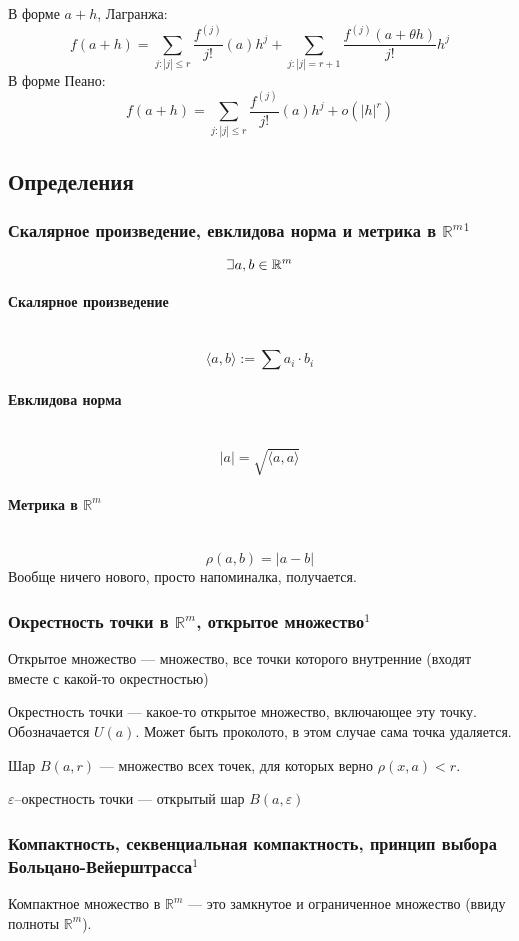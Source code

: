 \documentclass{article}
\def\letus{%
\mathord{\setbox0=\hbox{$\exists$}%
         \hbox{\kern 0.125\wd0%
               \vbox to \ht0{%
                  \hrule width 0.75\wd0%
                  \vfill%
                  \hrule width 0.75\wd0}%
               \vrule height \ht0%
               \kern 0.125\wd0}%
       }%
        }
\let\vanillaparagraph\paragraph
\renewcommand{\paragraph}[1]{\vanillaparagraph{#1}\mbox{}\\}
\begin{document}
В форме $a + h$, Лагранжа:
$$
f(a + h) = \sum_{j:|j| \leq r} \frac{f^{(j)}}{j!}(a)h^j + \sum_{j: |j| = r + 1} \frac{f^{(j)}(a + \theta h)} {j!} h^j
$$
В форме Пеано:
$$
f(a + h) = \sum_{j:|j| \leq r} \frac{f^{(j)}}{j!}(a)h^j + o(|h|^r)
$$

\newpage
\subsection{Определения}

\subsubsection{Скалярное произведение, евклидова норма и метрика в \texorpdfstring{$\mathbb{R}^m$}{R\^m}\texorpdfstring{$^1$}{}}
$$
\letus a, b \in \mathbb{R}^m
$$
\paragraph{Скалярное произведение}
$$
\langle a, b \rangle := \sum a_i \cdot b_i
$$

\paragraph{Евклидова норма}
$$
|a| = \sqrt{\langle a, a\rangle}
$$

\paragraph{Метрика в \texorpdfstring{$\mathbb{R}^m$}{R\^m}}
$$
\rho(a, b) = |a - b|
$$
Вообще ничего нового, просто напоминалка, получается. 

\subsubsection{Окрестность точки в \texorpdfstring{$\mathbb{R}^m$}{R\^m}, открытое множество\texorpdfstring{$^1$}{}}
Открытое множество --- множество, все точки которого внутренние (входят вместе с какой-то окрестностью)

Окрестность точки --- какое-то открытое множество, включающее эту точку. Обозначается $U(a)$. Может быть проколото, в этом случае сама точка удаляется. 

Шар $B(a, r)$ --- множество всех точек, для которых верно $\rho(x, a) < r$.

$\varepsilon$--окрестность точки --- открытый шар $B(a, \varepsilon)$

\subsubsection{Компактность, секвенциальная компактность, принцип выбора Больцано-Вейерштрасса\texorpdfstring{$^1$}{}}
Компактное множество в $\mathbb{R}^m$ --- это замкнутое и ограниченное множество (ввиду полноты $\mathbb{R}^m$).
\end{document}
